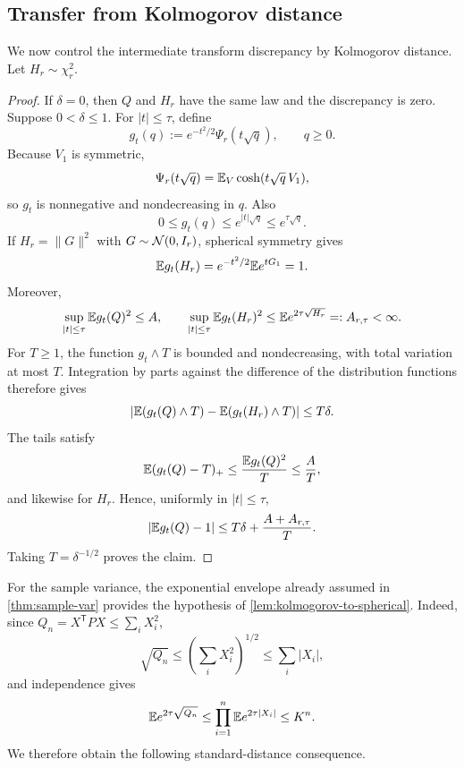 \subsection{Transfer from Kolmogorov distance}\label{subsec:sample-kolmogorov}

We now control the intermediate transform discrepancy by Kolmogorov distance. Let $H_r\sim\chi_r^2$.


\begin{proof}
If $\delta=0$, then $Q$ and $H_r$ have the same law and the discrepancy is zero. Suppose $0<\delta\le1$. For $|t|\le\tau$, define
\[
g_t(q):=e^{-t^2/2}\Psi_r(t\sqrt q),\qquad q\ge0.
\]
Because $V_1$ is symmetric,
\[
\Psi_r(t\sqrt q)=\mathbb E_V\cosh(t\sqrt q\,V_1),
\]
so $g_t$ is nonnegative and nondecreasing in $q$. Also
\[
0\le g_t(q)\le e^{|t|\sqrt q}\le e^{\tau\sqrt q}.
\]
If $H_r=\|G\|^2$ with $G\sim\mathcal N(0,I_r)$, spherical symmetry gives
\[
\mathbb E g_t(H_r)=e^{-t^2/2}\mathbb E e^{tG_1}=1.
\]
Moreover,
\[
\sup_{|t|\le\tau}\mathbb E g_t(Q)^2\le A,
\qquad
\sup_{|t|\le\tau}\mathbb E g_t(H_r)^2
\le \mathbb E e^{2\tau\sqrt{H_r}}=:A_{r,\tau}<\infty.
\]
For $T\ge1$, the function $g_t\wedge T$ is bounded and nondecreasing, with total variation at most $T$. Integration by parts against the difference of the distribution functions therefore gives
\[
\left|\mathbb E(g_t(Q)\wedge T)-\mathbb E(g_t(H_r)\wedge T)\right|
\le T\delta.
\]
The tails satisfy
\[
\mathbb E(g_t(Q)-T)_+\le\frac{\mathbb E g_t(Q)^2}{T}\le\frac{A}{T},
\]
and likewise for $H_r$. Hence, uniformly in $|t|\le\tau$,
\[
|\mathbb E g_t(Q)-1|
\le T\delta+\frac{A+A_{r,\tau}}{T}.
\]
Taking $T=\delta^{-1/2}$ proves the claim.
\end{proof}

For the sample variance, the exponential envelope already assumed in \cref{thm:sample-var} provides the hypothesis of \cref{lem:kolmogorov-to-spherical}. Indeed, since $Q_n=X^{\mathsf T}PX\le\sum_iX_i^2$,
\[
\sqrt{Q_n}\le\left(\sum_iX_i^2\right)^{1/2}\le\sum_i|X_i|,
\]
and independence gives
\begin{equation}\label{eq:sample-var-radial-envelope}
\mathbb E e^{2\tau\sqrt{Q_n}}
\le\prod_{i=1}^n\mathbb E e^{2\tau|X_i|}
\le K^n.
\end{equation}
We therefore obtain the following standard-distance consequence.

